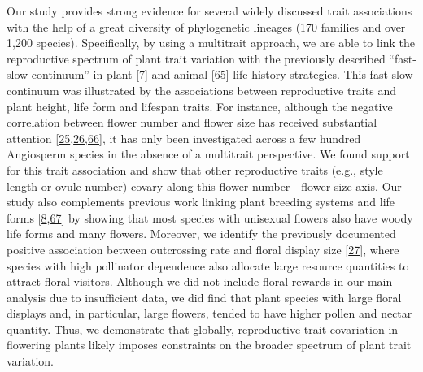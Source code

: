\documentclass[
  12pt,
  a4paper,
]{article}
\begin{document}
Our study provides strong evidence for several widely discussed trait associations with the help of a great diversity of phylogenetic lineages (170 families and over 1,200 species). Specifically, by using a multitrait approach, we are able to link the reproductive spectrum of plant trait variation with the previously described ``fast-slow continuum'' in plant {[}\protect\hyperlink{ref-salguero2016}{7}{]} and animal {[}\protect\hyperlink{ref-healy2019}{65}{]} life-history strategies. This fast-slow continuum was illustrated by the associations between reproductive traits and plant height, life form and lifespan traits. For instance, although the negative correlation between flower number and flower size has received substantial attention {[}\protect\hyperlink{ref-sargent2007}{25},\protect\hyperlink{ref-kettle2011}{26},\protect\hyperlink{ref-worley2000}{66}{]}, it has only been investigated across a few hundred Angiosperm species in the absence of a multitrait perspective. We found support for this trait association and show that other reproductive traits (e.g., style length or ovule number) covary along this flower number - flower size axis. Our study also complements previous work linking plant breeding systems and life forms {[}\protect\hyperlink{ref-friedman2020}{8},\protect\hyperlink{ref-petit2006}{67}{]} by showing that most species with unisexual flowers also have woody life forms and many flowers. Moreover, we identify the previously documented positive association between outcrossing rate and floral display size {[}\protect\hyperlink{ref-goodwillie2010}{27}{]}, where species with high pollinator dependence also allocate large resource quantities to attract floral visitors. Although we did not include floral rewards in our main analysis due to insufficient data, we did find that plant species with large floral displays and, in particular, large flowers, tended to have higher pollen and nectar quantity. Thus, we demonstrate that globally, reproductive trait covariation in flowering plants likely imposes constraints on the broader spectrum of plant trait variation.
\end{document}
